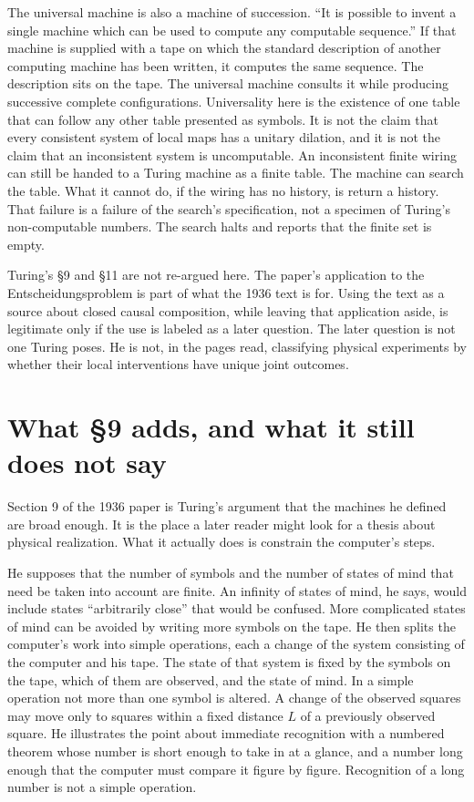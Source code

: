 \documentclass[12pt]{article}
\begin{document}
The universal machine is also a machine of succession. ``It is possible to invent a single machine which can be used to compute any computable sequence.'' If that machine is supplied with a tape on which the standard description of another computing machine has been written, it computes the same sequence. The description sits on the tape. The universal machine consults it while producing successive complete configurations. Universality here is the existence of one table that can follow any other table presented as symbols. It is not the claim that every consistent system of local maps has a unitary dilation, and it is not the claim that an inconsistent system is uncomputable. An inconsistent finite wiring can still be handed to a Turing machine as a finite table. The machine can search the table. What it cannot do, if the wiring has no history, is return a history. That failure is a failure of the search's specification, not a specimen of Turing's non-computable numbers. The search halts and reports that the finite set is empty.

Turing's \S 9 and \S 11 are not re-argued here. The paper's application to the Entscheidungsproblem is part of what the 1936 text is for. Using the text as a source about closed causal composition, while leaving that application aside, is legitimate only if the use is labeled as a later question. The later question is not one Turing poses. He is not, in the pages read, classifying physical experiments by whether their local interventions have unique joint outcomes.

\section{What \S 9 adds, and what it still does not say}
\label{sec:s9}

Section 9 of the 1936 paper is Turing's argument that the machines he defined are broad enough. It is the place a later reader might look for a thesis about physical realization. What it actually does is constrain the computer's steps.

He supposes that the number of symbols and the number of states of mind that need be taken into account are finite. An infinity of states of mind, he says, would include states ``arbitrarily close'' that would be confused. More complicated states of mind can be avoided by writing more symbols on the tape. He then splits the computer's work into simple operations, each a change of the system consisting of the computer and his tape. The state of that system is fixed by the symbols on the tape, which of them are observed, and the state of mind. In a simple operation not more than one symbol is altered. A change of the observed squares may move only to squares within a fixed distance $L$ of a previously observed square. He illustrates the point about immediate recognition with a numbered theorem whose number is short enough to take in at a glance, and a number long enough that the computer must compare it figure by figure. Recognition of a long number is not a simple operation.
\end{document}
